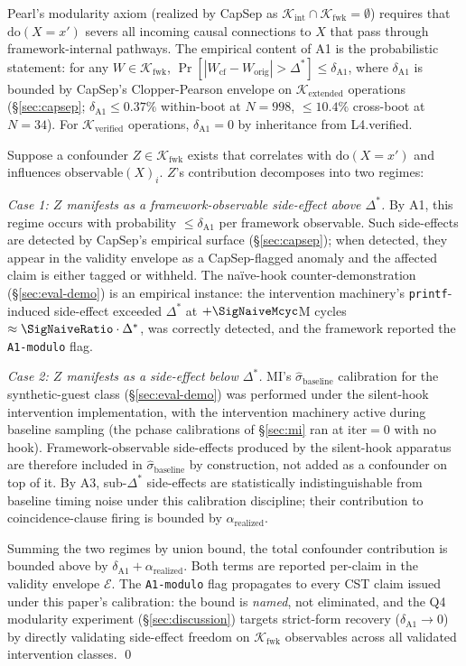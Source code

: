 \documentclass[conference]{IEEEtran}
\newcommand{\Kverified}{\mathcal{K}_\text{verified}}
\newcommand{\Kextended}{\mathcal{K}_\text{extended}}
\newcommand{\Kint}{\mathcal{K}_\text{int}}
\newcommand{\Kfwk}{\mathcal{K}_\text{fwk}}
\newcommand{\sigbase}{\hat{\sigma}_\text{baseline}}
\newcommand{\Dstar}{\Delta^{*}}
\newcommand{\arealized}{\alpha_\text{realized}}
\newcommand{\dox}[1]{\text{do}(X{=}#1)}
\begin{document}
Pearl's modularity axiom (realized by CapSep as
$\Kint \cap \Kfwk = \emptyset$) requires that $\dox{x'}$ severs
all incoming causal connections to $X$ that pass through
framework-internal pathways. The empirical content of A1 is the
probabilistic statement: for any $W \in \Kfwk$,
$\Pr[|W_{\text{cf}} - W_{\text{orig}}| > \Dstar] \leq
\delta_{\text{A1}}$, where $\delta_{\text{A1}}$ is bounded by
CapSep's Clopper-Pearson envelope on $\Kextended$ operations
(\S\ref{sec:capsep}; $\delta_{\text{A1}} \leq 0.37\%$ within-boot
at $N{=}998$, $\leq 10.4\%$ cross-boot at $N{=}34$). For
$\Kverified$ operations, $\delta_{\text{A1}} = 0$ by inheritance
from L4.verified.

Suppose a confounder $Z \in \Kfwk$ exists that correlates with
$\dox{x'}$ and influences $\text{observable}(X)_i$. $Z$'s
contribution decomposes into two regimes:

\emph{Case 1: $Z$ manifests as a framework-observable side-effect
above $\Dstar$.} By A1, this regime occurs with probability
$\leq \delta_{\text{A1}}$ per framework observable. Such
side-effects are detected by CapSep's empirical surface
(\S\ref{sec:capsep}); when detected, they appear in the validity
envelope as a CapSep-flagged anomaly and the affected claim is
either tagged or withheld. The naïve-hook counter-demonstration
(\S\ref{sec:eval-demo}) is an empirical instance: the intervention
machinery's \texttt{printf}-induced side-effect exceeded $\Dstar$
at $+\SigNaiveMcyc$M cycles $\approx \SigNaiveRatio \cdot \Dstar$, was correctly
detected, and the framework reported the \texttt{A1-modulo} flag.

\emph{Case 2: $Z$ manifests as a side-effect below $\Dstar$.}
MI's $\sigbase$ calibration for the synthetic-guest class
(\S\ref{sec:eval-demo}) was performed under the silent-hook
intervention implementation, with the intervention machinery active
during baseline sampling (the pchase calibrations of \S\ref{sec:mi}
ran at iter$=0$ with no hook).
Framework-observable side-effects produced by the silent-hook
apparatus are therefore included in $\sigbase$ by construction,
not added as a confounder on top of it. By A3, sub-$\Dstar$
side-effects are statistically indistinguishable from baseline
timing noise under this calibration discipline; their contribution
to coincidence-clause firing is bounded by $\arealized$.

Summing the two regimes by union bound, the total confounder
contribution is bounded above by
$\delta_{\text{A1}} + \arealized$. Both terms are reported
per-claim in the validity envelope $\mathcal{E}$. The
\texttt{A1-modulo} flag propagates to every CST claim issued under
this paper's calibration: the bound is \emph{named}, not
eliminated, and the Q4 modularity experiment
(\S\ref{sec:discussion}) targets strict-form recovery
($\delta_{\text{A1}} \to 0$) by directly validating side-effect
freedom on $\Kfwk$ observables across all validated intervention
classes. \qed
\end{document}
